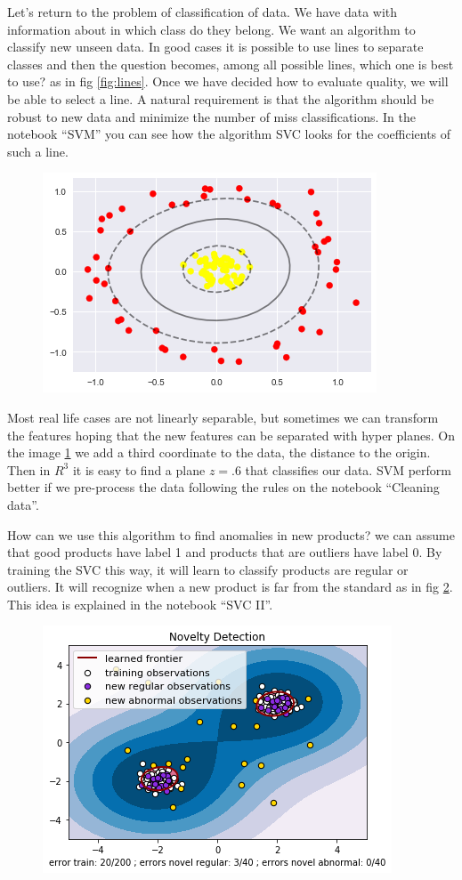 \documentclass[11pt,letterpaper]{report}
\begin{document}
	Let's return to the problem of classification of data. We have data with information about in which class do they belong. We want an algorithm to classify new unseen data. In good cases it is possible to use lines to separate classes and then the question becomes, among all possible lines, which one is best to use? as in fig \ref{fig:lines}. Once we have decided how to evaluate quality, we will be able to select a line. A natural requirement is that the algorithm should be robust to new data and minimize the number of miss classifications. In the notebook ``SVM'' you can see how the algorithm SVC looks for  the coefficients of such a line.

\begin{figure}[h!]
	\centering
	\includegraphics[width=0.45\linewidth]{figures/svc.png}
	\caption{}
	\label{fig:kernel}
\end{figure} 
	
 Most real life cases are not linearly separable, but sometimes we can transform the features hoping that the new features can be separated  with hyper planes. On the image \ref{fig:kernel} we add a third coordinate to the data, the distance to the origin. Then in $R^3$ it is easy to find a plane $z=.6$ that classifies our data. SVM perform better if we pre-process the data following the rules on the notebook ``Cleaning data''. 
 
How can we use this algorithm to find anomalies in new products? we can assume that good products have label 1 and products that are outliers have label 0. By training the SVC this way, it will learn to classify products are regular or outliers. It will recognize when a new product is far from the standard as in fig \ref{fig:novelty}. This idea is explained in the notebook ``SVC II''. 
	
	\begin{figure}[h!]
		\centering
		\includegraphics[width=0.45\linewidth]{figures/novelty.png}
		\caption{}
		\label{fig:novelty}
	\end{figure} 
	
\end{document}
